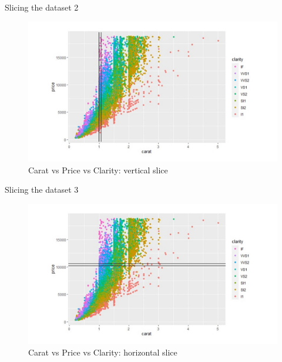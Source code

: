 \documentclass[
  ignorenonframetext,
]{beamer}
\begin{document}
\begin{frame}{Slicing the dataset 2}
\protect\hypertarget{slicing-the-dataset-2}{}
\begin{figure}
\centering
\includegraphics{./scatterplot vertical slice.jpg}
\caption{Carat vs Price vs Clarity: vertical slice}
\end{figure}
\end{frame}

\begin{frame}{Slicing the dataset 3}
\protect\hypertarget{slicing-the-dataset-3}{}
\begin{figure}
\centering
\includegraphics{./coloured scatterplot carat vs price vs clarity 3.jpg}
\caption{Carat vs Price vs Clarity: horizontal slice}
\end{figure}
\end{frame}
\end{document}
